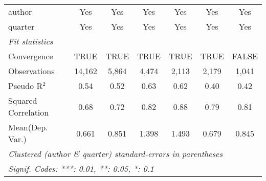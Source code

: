 \begin{tabular}{lcccccc}
   author                                                     & Yes           & Yes          & Yes          & Yes          & Yes            & Yes\\  
   quarter                                                    & Yes           & Yes          & Yes          & Yes          & Yes            & Yes\\  
   \midrule
   \emph{Fit statistics}\\
   Convergence                                                &TRUE           & TRUE         & TRUE         & TRUE         & TRUE           & FALSE\\  
   Observations                                               & 14,162        & 5,864        & 4,474        & 2,113        & 2,179          & 1,041\\  
   Pseudo R$^2$                                               & 0.54          & 0.52         & 0.63         & 0.62         & 0.40           & 0.42\\  
   Squared Correlation                                        & 0.68          & 0.72         & 0.82         & 0.88         & 0.79           & 0.81\\  
Mean(Dep. Var.) & 0.661 & 0.851 & 1.398 & 1.493 & 0.679 & 0.845 \\
   \midrule \midrule
   \multicolumn{7}{l}{\emph{Clustered (author \& quarter) standard-errors in parentheses}}\\
   \multicolumn{7}{l}{\emph{Signif. Codes: ***: 0.01, **: 0.05, *: 0.1}}\\
\end{tabular}
\par\endgroup
